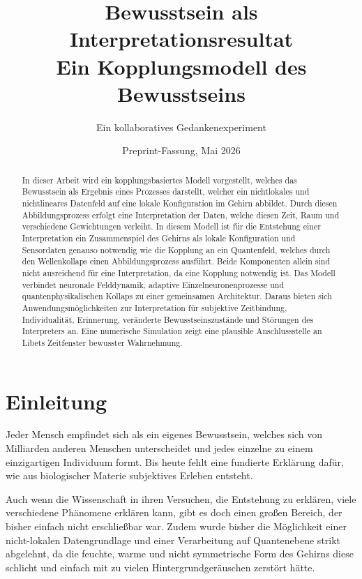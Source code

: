 \documentclass[11pt,a4paper]{article}
\title{\textbf{Bewusstsein als Interpretationsresultat}\\
\large Ein Kopplungsmodell des Bewusstseins}
\author{Ein kollaboratives Gedankenexperiment}
\date{Preprint-Fassung, Mai 2026}
\begin{document}
\maketitle

\begin{abstract}
In dieser Arbeit wird ein kopplungsbasiertes Modell vorgestellt, welches das Bewusstsein als Ergebnis eines Prozesses darstellt, welcher ein nichtlokales und nichtlineares Datenfeld auf eine lokale Konfiguration im Gehirn abbildet. Durch diesen Abbildungsprozess erfolgt eine Interpretation der Daten, welche diesen Zeit, Raum und verschiedene Gewichtungen verleiht.
In diesem Modell ist für die Entstehung einer Interpretation ein Zusammenspiel des Gehirns als lokale Konfiguration und Sensordaten genauso notwendig wie die Kopplung an ein Quantenfeld, welches durch den Wellenkollaps einen Abbildungsprozess ausführt. Beide Komponenten allein sind nicht ausreichend für eine Interpretation, da eine Kopplung notwendig ist.
Das Modell verbindet neuronale Felddynamik, adaptive Einzelneuronenprozesse und quantenphysikalischen Kollaps zu einer gemeinsamen Architektur. Daraus bieten sich Anwendungsmöglichkeiten zur Interpretation für subjektive Zeitbindung, Individualität, Erinnerung, veränderte Bewusstseinszustände und Störungen des Interpreters an. Eine numerische Simulation zeigt eine plausible Anschlussstelle an Libets Zeitfenster bewusster Wahrnehmung.
\end{abstract}

\tableofcontents
{}
\newpage

\section*{Einleitung}
Jeder Mensch empfindet sich als ein eigenes Bewusstsein, welches sich von Milliarden
anderen Menschen unterscheidet und jedes einzelne zu einem einzigartigen Individuum
formt. Bis heute fehlt eine fundierte Erklärung dafür, wie aus biologischer
Materie subjektives Erleben entsteht.

Auch wenn die Wissenschaft in ihren Versuchen, die Entstehung zu erklären, viele
verschiedene Phänomene erklären kann, gibt es doch einen großen Bereich, der bisher
einfach nicht erschließbar war. Zudem wurde bisher die Möglichkeit einer nicht-lokalen
Datengrundlage und einer Verarbeitung auf Quantenebene strikt abgelehnt, da die
feuchte, warme und nicht symmetrische Form des Gehirns diese schlicht und einfach mit
zu vielen Hintergrundgeräuschen zerstört hätte.
\end{document}
